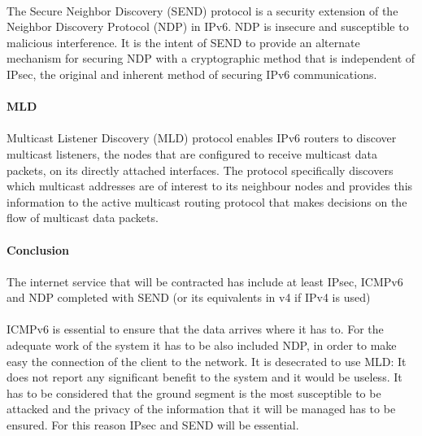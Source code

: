 \paragraph{}
The Secure Neighbor Discovery (SEND) protocol is a security extension of the Neighbor Discovery Protocol (NDP) in IPv6. NDP is insecure and susceptible to malicious interference. It is the intent of SEND to provide an alternate mechanism for securing NDP with a cryptographic method that is independent of IPsec, the original and inherent method of securing IPv6 communications.

\paragraph{} \textbf{MLD}
\paragraph{}
Multicast Listener Discovery (MLD) protocol enables IPv6 routers to discover multicast listeners, the nodes that are configured to receive multicast data packets, on its directly attached interfaces. The protocol specifically discovers which multicast addresses are of interest to its neighbour nodes and provides this information to the active multicast routing protocol that makes decisions on the flow of multicast data packets. 


\paragraph{} \textbf{Conclusion}
\paragraph{}
The internet service that will be contracted has include at least IPsec, ICMPv6 and NDP completed with SEND (or its equivalents in v4 if IPv4 is used)
\paragraph{} 
ICMPv6 is essential to ensure that the data arrives where it has to. For the adequate work of the system it has to be also included  NDP, in order to make easy the connection of the client to the network. It is desecrated to use MLD: It does not report any significant benefit to the system and it would be useless. It has to be considered that the ground segment is the most susceptible to be attacked and the privacy of the information that it will be managed has to be ensured. For this reason IPsec and SEND will be essential.
